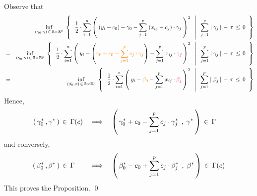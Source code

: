 \proof
Observe that
\begin{eqnarray*}
&&
	\underset{(\gamma_{0},\gamma)\,\in\,\Re\times\Re^{p}}{\inf}\;
	\left\{\;\;
		\left.
		\dfrac{1}{2}
		\cdot
		\overset{n}{\underset{i=1}{\sum}}
		\left(\; (y_{i} - c_{0}) - \gamma_{0} - \overset{p}{\underset{j=1}{\sum}}\; (x_{ij}-c_{j})\cdot\gamma_{j}\;\right)^{2}
		\;\;\,\right\vert\;\;
		\overset{p}{\underset{j=1}{\sum}}\;
		\vert\;\gamma_{j}\,\vert
		\, - \,
		\tau \, \leq \, 0
		\;\;\right\}
\\
& = &
	\underset{(\gamma_{0},\gamma)\,\in\,\Re\times\Re^{p}}{\inf}\;
	\left\{\;\;
		\left.
		\dfrac{1}{2}
		\cdot
		\overset{n}{\underset{i=1}{\sum}}
		\left(\; y_{i} -
		\left({\color{orange}\gamma_{0} + c_{0} - \overset{p}{\underset{j=1}{\sum}}\,c_{j}\cdot\gamma_{j}}\right)
		- \overset{p}{\underset{j=1}{\sum}}\; x_{ij}\cdot{\color{red}\gamma_{j}}\,\right)^{2}
		\;\;\,\right\vert\;\;
		\overset{p}{\underset{j=1}{\sum}}\;
		\vert\;\gamma_{j}\,\vert
		\, - \,
		\tau \, \leq \, 0
		\;\;\right\}
\\
& = &
	\underset{(\beta_{0},\beta)\,\in\,\Re\times\Re^{p}}{\inf}\;
	\left\{\;\;
		\left.
		\dfrac{1}{2}
		\cdot
		\overset{n}{\underset{i=1}{\sum}}
		\left(\; y_{i} - {\color{orange}\beta_{0}} - \overset{p}{\underset{j=1}{\sum}}\; x_{ij}\cdot{\color{red}\beta_{j}}\,\right)^{2}
		\;\;\,\right\vert\;\;
		\overset{p}{\underset{j=1}{\sum}}\;
		\vert\;\beta_{j}\,\vert
		\, - \,
		\tau \, \leq \, 0
		\;\;\right\}
\end{eqnarray*}
Hence,
\begin{equation*}
(\,\gamma_{0}^{*}\,,\gamma^{*}\,) \,\in\, \Gamma(c)
\quad\Longrightarrow\quad
\left(\,\gamma_{0}^{*}+c_{0} - \overset{p}{\underset{j=1}{\sum}}\,c_{j}\cdot\gamma_{j}^{*}\;\,,\;\gamma^{*}\,\right)
\,\in\,\Gamma{\color{white}(c)}
\end{equation*}
and conversely,
\begin{equation*}
(\,\beta_{0}^{*}\,,\beta^{*}\,) \,\in\, \Gamma{\color{white}(c)}
\quad\Longrightarrow\quad
\left(\,\beta_{0}^{*} - c_{0} + \overset{p}{\underset{j=1}{\sum}}\,c_{j}\cdot\beta_{j}^{*}\;\,,\;\beta^{*}\,\right)
\,\in\, \Gamma(c)
\end{equation*}
This proves the Proposition.
\qed


